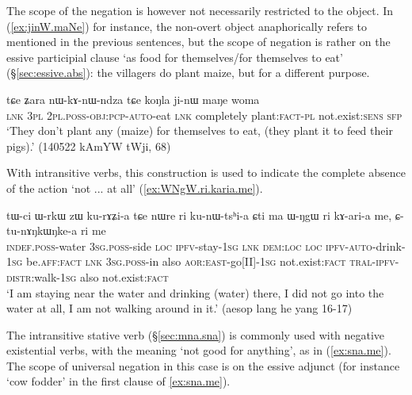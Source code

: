 The scope of the negation is however not necessarily restricted to the object. In (\ref{ex:jinW.maNe}) for instance, the non-overt object anaphorically refers to  mentioned in the previous sentences, but the scope of negation is rather on the essive participial clause  `as food for themselves/for themselves to eat' (§\ref{sec:essive.abs}): the villagers do  plant maize, but for a different purpose.
 
\begin{exe}
\ex \label{ex:jinW.maNe}
\gll tɕe ʑara nɯ-kɤ-nɯ-ndza tɕe koŋla ji-nɯ maŋe woma \\
\textsc{lnk} \textsc{3pl} \textsc{2pl}.\textsc{poss}-\textsc{obj}:\textsc{pcp}-\textsc{auto}-eat \textsc{lnk} completely plant:\textsc{fact}-\textsc{pl} not.exist:\textsc{sens} \textsc{sfp} \\
\glt `They don't  plant any (maize) for themselves to eat, (they plant it to feed their pigs).'  (140522 kAmYW tWji, 68)
\end{exe}

With intransitive verbs, this construction is used to indicate the complete absence of the action `not ... at all' (\ref{ex:WNgW.ri.karia.me}).

\begin{exe}
\ex \label{ex:WNgW.ri.karia.me} 
\gll  tɯ-ci ɯ-rkɯ zɯ ku-rɤʑi-a tɕe nɯre ri ku-nɯ-tsʰi-a ɕti ma ɯ-ŋgɯ ri kɤ-ari-a me, ɕ-tu-nɤŋkɯŋke-a ri me \\
\textsc{indef}.\textsc{poss}-water \textsc{3sg}.\textsc{poss}-side \textsc{loc} \textsc{ipfv}-stay-\textsc{1sg} \textsc{lnk} \textsc{dem}:\textsc{loc} \textsc{loc} \textsc{ipfv}-\textsc{auto}-drink-\textsc{1sg} be.\textsc{aff}:\textsc{fact} \textsc{lnk} \textsc{3sg}.\textsc{poss}-in also \textsc{aor}:\textsc{east}-go[II]-\textsc{1sg} not.exist:\textsc{fact} \textsc{tral}-\textsc{ipfv}-\textsc{distr}:walk-\textsc{1sg} also not.exist:\textsc{fact} \\
\glt `I am staying near the water and drinking (water) there, I did not go into the water at all, I am not walking around in it.' (aesop lang he yang 16-17)
\end{exe}

The intransitive stative verb  (§\ref{sec:mna.sna}) is commonly used with negative existential verbs, with the meaning `not good for anything', as in (\ref{ex:sna.me}). The scope of universal negation in this case is on the essive adjunct (for instance  `cow fodder' in the first clause of \ref{ex:sna.me}).

